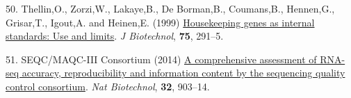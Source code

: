 \documentclass[
]{article}
\newlength{\cslhangindent}
\newenvironment{CSLReferences}[2] %
 {\begin{list}{}{%
  \setlength{\itemindent}{0pt}
  \setlength{\leftmargin}{0pt}
  \setlength{\parsep}{0pt}
  \ifodd #1
   \setlength{\leftmargin}{\cslhangindent}
   \setlength{\itemindent}{-1\cslhangindent}
  \fi
  \setlength{\itemsep}{#2\baselineskip}}}
 {\end{list}}
\begin{document}
\begin{CSLReferences}{1}{1}
50. Thellin,O., Zorzi,W., Lakaye,B., De Borman,B., Coumans,B.,
Hennen,G., Grisar,T., Igout,A. and Heinen,E. (1999)
\href{https://www.ncbi.nlm.nih.gov/pubmed/10617337}{Housekeeping genes
as internal standards: Use and limits}. \emph{J Biotechnol},
\textbf{75}, 291--5.

51. SEQC/MAQC-III Consortium (2014)
\href{https://doi.org/10.1038/nbt.2957}{A comprehensive assessment of
RNA-seq accuracy, reproducibility and information content by the
sequencing quality control consortium}. \emph{Nat Biotechnol},
\textbf{32}, 903--14.

\end{CSLReferences}
\end{document}
